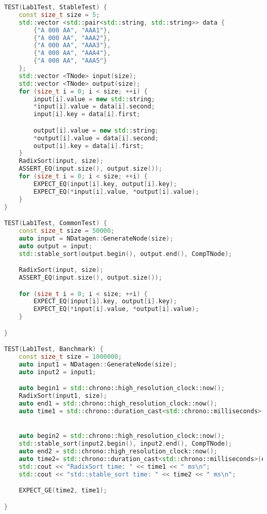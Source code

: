 \begin{lstlisting}[language=C++]
TEST(Lab1Test, StableTest) {
    const size_t size = 5;
    std::vector <std::pair<std::string, std::string>> data {
        {"A 000 AA", "AAA1"},
        {"A 000 AA", "AAA2"},
        {"A 000 AA", "AAA3"},
        {"A 000 AA", "AAA4"},
        {"A 000 AA", "AAA5"}
    };
    std::vector <TNode> input(size);
    std::vector <TNode> output(size);
    for (size_t i = 0; i < size; ++i) {
        input[i].value = new std::string;
        *input[i].value = data[i].second;
        input[i].key = data[i].first;

        output[i].value = new std::string;
        *output[i].value = data[i].second;
        output[i].key = data[i].first;
    }
    RadixSort(input, size);
    ASSERT_EQ(input.size(), output.size());
    for (size_t i = 0; i < size; ++i) {
        EXPECT_EQ(input[i].key, output[i].key);
        EXPECT_EQ(*input[i].value, *output[i].value);
    }
}

TEST(Lab1Test, CommonTest) {
    const size_t size = 50000;
    auto input = NDatagen::GenerateNode(size);
    auto output = input;
    std::stable_sort(output.begin(), output.end(), CompTNode);

    RadixSort(input, size);
    ASSERT_EQ(input.size(), output.size());

    for (size_t i = 0; i < size; ++i) {
        EXPECT_EQ(input[i].key, output[i].key);
        EXPECT_EQ(*input[i].value, *output[i].value);
    }

}

TEST(Lab1Test, Banchmark) {
    const size_t size = 1000000;
    auto input1 = NDatagen::GenerateNode(size);
    auto input2 = input1;

    auto begin1 = std::chrono::high_resolution_clock::now();
    RadixSort(input1, size);
    auto end1 = std::chrono::high_resolution_clock::now();
    auto time1 = std::chrono::duration_cast<std::chrono::milliseconds>(end1 - begin1).count();


    auto begin2 = std::chrono::high_resolution_clock::now();
    std::stable_sort(input2.begin(), input2.end(), CompTNode);
    auto end2 = std::chrono::high_resolution_clock::now();
    auto time2= std::chrono::duration_cast<std::chrono::milliseconds>(end2 - begin2).count();
    std::cout << "RadixSort time: " << time1 << " ms\n";
    std::cout << "std::stable_sort time: " << time2 << " ms\n";

    EXPECT_GE(time2, time1);

}
\end{lstlisting}



